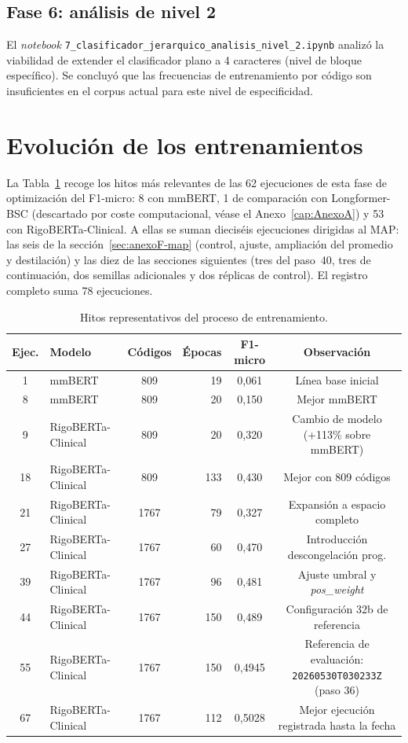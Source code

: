 \subsection{Fase 6: análisis de nivel 2}

El \emph{notebook} \texttt{7\_clasificador\_jerarquico\_analisis\_nivel\_2.ipynb} analizó la viabilidad de extender el clasificador plano a 4 caracteres (nivel de bloque específico). Se concluyó que las frecuencias de entrenamiento por código son insuficientes en el corpus actual para este nivel de especificidad.

\section{Evolución de los entrenamientos}

La Tabla~\ref{tab:training-evolution} recoge los hitos más relevantes de las 62 ejecuciones de esta fase de optimización del F1-micro: 8 con mmBERT, 1 de comparación con Longformer-BSC (descartado por coste computacional, véase el Anexo~\ref{cap:AnexoA}) y 53 con RigoBERTa-Clinical. A ellas se suman dieciséis ejecuciones dirigidas al MAP: las seis de la sección~\ref{sec:anexoF-map} (control, ajuste, ampliación del promedio y destilación) y las diez de las secciones siguientes (tres del paso~40, tres de continuación, dos semillas adicionales y dos réplicas de control). El registro completo suma 78 ejecuciones.

\begin{table}[h]
\centering
\caption{Hitos representativos del proceso de entrenamiento.}
\label{tab:training-evolution}
\begin{tabular}{clcrcc}
\hline
\textbf{Ejec.} & \textbf{Modelo} & \textbf{Códigos} & \textbf{Épocas} & \textbf{F1-micro} & \textbf{Observación} \\
\hline
1 & mmBERT & 809 & 19 & 0{,}061 & Línea base inicial \\
8 & mmBERT & 809 & 20 & 0{,}150 & Mejor mmBERT \\
9 & RigoBERTa-Clinical & 809 & 20 & 0{,}320 & Cambio de modelo (+113\% sobre mmBERT) \\
18 & RigoBERTa-Clinical & 809 & 133 & 0{,}430 & Mejor con 809 códigos \\
21 & RigoBERTa-Clinical & 1767 & 79 & 0{,}327 & Expansión a espacio completo \\
27 & RigoBERTa-Clinical & 1767 & 60 & 0{,}470 & Introducción descongelación prog. \\
39 & RigoBERTa-Clinical & 1767 & 96 & 0{,}481 & Ajuste umbral y \emph{pos\_weight} \\
44 & RigoBERTa-Clinical & 1767 & 150 & 0{,}489 & Configuración 32b de referencia \\
55 & RigoBERTa-Clinical & 1767 & 150 & 0{,}4945 & Referencia de evaluación: \texttt{20260530T030233Z} (paso 36) \\
67 & RigoBERTa-Clinical & 1767 & 112 & 0{,}5028 & Mejor ejecución registrada hasta la fecha \\
\hline
\end{tabular}
\end{table}

